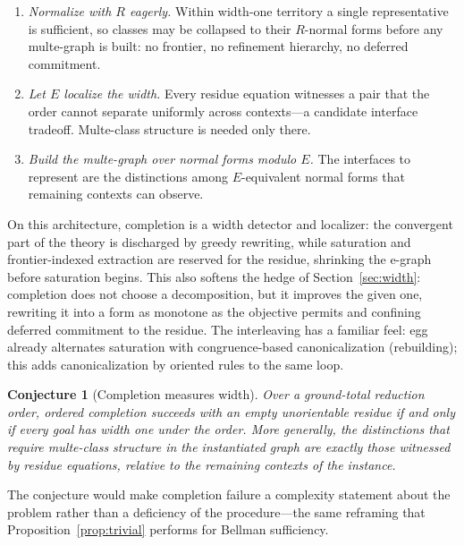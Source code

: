 \documentclass[sigconf,nonacm]{acmart}
\theoremstyle{definition}
\theoremstyle{plain}
\newtheorem{conjecture}[definition]{Conjecture}
\theoremstyle{remark}
\begin{document}
\begin{enumerate}

\item
\emph{Normalize with $R$ eagerly.}  Within width-one territory a
single representative is sufficient, so classes may be collapsed to
their $R$-normal forms before any multe-graph is built: no frontier,
no refinement hierarchy, no deferred commitment.

\item
\emph{Let $E$ localize the width.}  Every residue equation witnesses
a pair that the order cannot separate uniformly across contexts---a
candidate interface tradeoff.  Multe-class structure is needed only
there.

\item
\emph{Build the multe-graph over normal forms modulo $E$.}  The
interfaces to represent are the distinctions among $E$-equivalent
normal forms that remaining contexts can observe.

\end{enumerate}

On this architecture, completion is a width detector and localizer:
the convergent part of the theory is discharged by greedy rewriting,
while saturation and frontier-indexed extraction are reserved for
the residue, shrinking the e-graph before saturation begins.  This
also softens the hedge of Section~\ref{sec:width}: completion does
not choose a decomposition, but it improves the given one, rewriting
it into a form as monotone as the objective permits and confining
deferred commitment to the residue.  The
interleaving has a familiar feel: egg already alternates saturation
with congruence-based canonicalization (rebuilding); this adds
canonicalization by oriented rules to the same loop.

\begin{conjecture}[Completion measures width]
\label{conj:completion-width}
Over a ground-total reduction order, ordered completion succeeds
with an empty unorientable residue if and only if every goal has
width one under the order.  More generally, the distinctions that
require multe-class structure in the instantiated graph are exactly
those witnessed by residue equations, relative to the remaining
contexts of the instance.
\end{conjecture}

The conjecture would make completion failure a complexity statement
about the problem rather than a deficiency of the procedure---the
same reframing that Proposition~\ref{prop:trivial} performs for
Bellman sufficiency.
\end{document}

